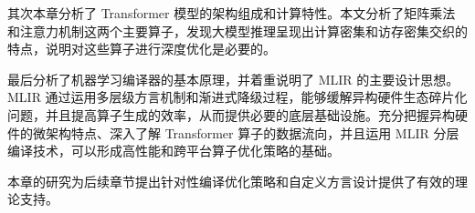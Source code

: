其次本章分析了 Transformer 模型的架构组成和计算特性。本文分析了矩阵乘法和注意力机制这两个主要算子，发现大模型推理呈现出计算密集和访存密集交织的特点，说明对这些算子进行深度优化是必要的。

最后分析了机器学习编译器的基本原理，并着重说明了 MLIR 的主要设计思想。MLIR 通过运用多层级方言机制和渐进式降级过程，能够缓解异构硬件生态碎片化问题，并且提高算子生成的效率，从而提供必要的底层基础设施。充分把握异构硬件的微架构特点、深入了解 Transformer 算子的数据流向，并且运用 MLIR 分层编译技术，可以形成高性能和跨平台算子优化策略的基础。

本章的研究为后续章节提出针对性编译优化策略和自定义方言设计提供了有效的理论支持。
